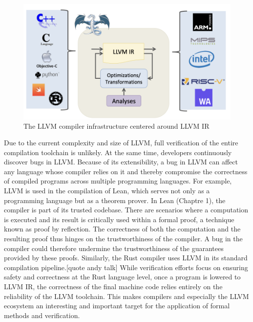 \begin{figure}[htbp]
  \centering
  \includegraphics[scale=0.4]{thesis/llvm.png}
  \caption{The LLVM compiler infrastructure centered around LLVM IR}
  \label{fig:intro_llvm}
\end{figure}

Due to the current complexity and size of LLVM, full verification of the entire compilation toolchain is unlikely. At the same time, developers continuously discover bugs in LLVM. Because of its extensibility, a bug in LLVM can affect any language whose compiler relies on it and thereby compromise the correctness of compiled programs across multiple programming languages.
For example, LLVM is used in the compilation of Lean, which serves not only as a programming language but as a theorem prover. In Lean (Chaptre 1), the compiler is part of its trusted codebase. There are scenarios where a computation is executed and its result is critically used within a formal proof, a technique known as proof by reflection. The correctness of both the computation and the resulting proof thus hinges on the trustworthiness of the compiler. A bug in the compiler could therefore undermine the trustworthiness of the guarantees provided by these proofs. Similarly, the Rust compiler uses LLVM in its standard compilation pipeline.[quote andy talk] While verification efforts focus on ensuring safety and correctness at the Rust language level, once a program is lowered to LLVM IR, the correctness of the final machine code relies entirely on the reliability of the LLVM toolchain. This makes compilers and especially the LLVM ecosystem an interesting and important target for the application of formal methods and verification.

